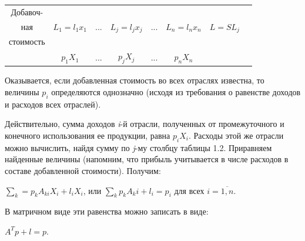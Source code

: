 \documentclass[12pt, 4paper]{book}
\begin{document}
{\begin{table}[h]
\begin{tabular}[center]{|p{0.2in}|p{0.2in}|p{1in}|p{0.2in}|p{1in}|p{0.2in}|p{1in}|p{0.3in}|p{0.3in}|}
		\multicolumn{2}{|c|}{{\tiny Добавоч-}}  & \multicolumn{1}{c|}{} & \multicolumn{1}{c|}{} & \multicolumn{1}{c|}{} & \multicolumn{1}{c|}{} & \multicolumn{1}{c|}{}& \multicolumn{1}{c|}{} & \multicolumn{1}{c|}{}\\  
		\multicolumn{2}{|c|}{{\tiny ная}}  & \multicolumn{1}{c|}{$L_1 = l_1x_1$} & \multicolumn{1}{c|}{...} & \multicolumn{1}{c|}{$L_j = l_jx_j$} & \multicolumn{1}{c|}{...} & \multicolumn{1}{c|}{$L_n = l_nx_n$}& \multicolumn{1}{c|}{$L = SL_j$} & \multicolumn{1}{c|}{}\\ 
		\multicolumn{2}{|c|}{{\tiny стоимость}}  & \multicolumn{1}{c|}{} & \multicolumn{1}{c|}{} & \multicolumn{1}{c|}{} & \multicolumn{1}{c|}{} & \multicolumn{1}{c|}{}& \multicolumn{1}{c|}{} & \multicolumn{1}{c|}{}\\ \hline
		\multicolumn{2}{|c|}{}  & \multicolumn{1}{c|}{$ p_1X_1 $} & \multicolumn{1}{c|}{...} & \multicolumn{1}{c|}{$ p_jX_j $} & \multicolumn{1}{c|}{...} & \multicolumn{1}{c|}{$ p_nX_n $}& \multicolumn{1}{c|}{} & \multicolumn{1}{c|}{}\\ \hline
	\end{tabular}
\end{table}
\par

Оказывается, если добавленная стоимость во всех отраслях известна, то величины $ p_i $ определяются однозначно (исходя из требования о равенстве доходов и расходов всех отраслей).
\par

Действительно, сумма доходов \textit{i}-й отрасли, полученных от промежуточного и конечного использования ее продукции, равна $ p_iX_i $. Расходы этой же отрасли можно вычислить, найдя сумму по \textit{j}-му столбцу таблицы 1.2. Приравняем найденные величины (напомним, что прибыль учитывается в числе расходов в составе добавленной стоимости). Получим:
\begin{center}
	$ \sum\limits_{k} = p_k A_{ki} X_i + l_i X_i$, или $ \sum\limits_{k} p_k A_ki + l_i = p_i $ для всех $ i = \overline{1,n}$.
\end{center}

\par

В матричном виде эти равенства можно записать в виде:
\begin{center}
	$ A^Tp + l = p $.
\end{center}

\par
	
}
\end{document}
